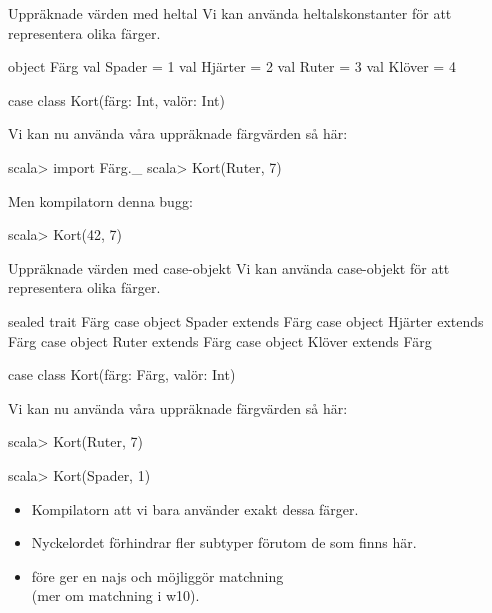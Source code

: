 

\begin{Slide}{Uppräknade värden med heltal}\SlideFontSmall
Vi kan använda heltalskonstanter för att representera olika färger.
\begin{Code}
object Färg {
  val Spader = 1
  val Hjärter = 2
  val Ruter = 3
  val Klöver = 4
}
\end{Code}
\begin{Code}[language=,keywords={case,class}]
case class Kort(färg: Int, valör: Int)
\end{Code}

Vi kan nu använda våra uppräknade färgvärden så här:
\begin{REPLnonum}
scala> import Färg._
scala> Kort(Ruter, 7)
\end{REPLnonum}
\pause Men kompilatorn  denna bugg:
\begin{REPLnonum}
scala> Kort(42, 7)
\end{REPLnonum}

\end{Slide}


\begin{Slide}{Uppräknade värden med case-objekt}\SlideFontSmall
Vi kan använda case-objekt för att representera olika färger.
\begin{Code}[language=,keywords={sealed,trait,object,case,class,extends}]
sealed trait Färg
case object Spader  extends Färg
case object Hjärter extends Färg
case object Ruter   extends Färg
case object Klöver  extends Färg

case class Kort(färg: Färg, valör: Int)
\end{Code}

Vi kan nu använda våra uppräknade färgvärden så här:
\begin{REPL}
scala> Kort(Ruter, 7)

scala> Kort(Spader, 1)
\end{REPL}
\begin{itemize}
\item Kompilatorn  att vi bara använder exakt dessa färger.

\item Nyckelordet  förhindrar fler subtyper förutom de som finns här.

\item {} före  ger en najs  och möjliggör matchning \\
(mer om matchning i w10).

\end{itemize}

\end{Slide}

